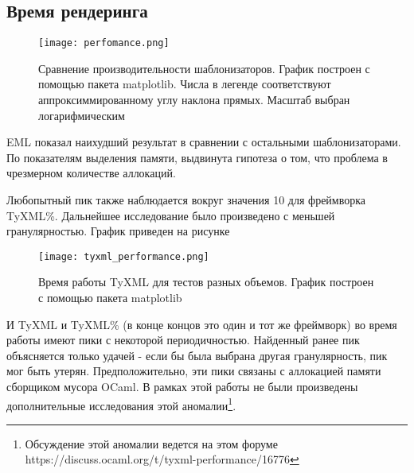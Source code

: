 

\subsection{Время рендеринга}


\begin{figure}
    \texttt{[image: perfomance.png]}
    \label{fig:perfomance}
    \caption{Сравнение производительности шаблонизаторов. График построен с помощью пакета matplotlib. Числа в легенде соответствуют аппроксиммированному углу наклона прямых. Масштаб выбран логарифмическим}
\end{figure}

EML показал наихудший результат в сравнении с остальными шаблонизаторами.
По показателям выделения памяти, выдвинута гипотеза о том, что проблема в чрезмерном количестве аллокаций.

Любопытный пик также наблюдается вокруг значения 10 для фреймворка TyXML\%.
Дальнейшее исследование было произведено с меньшей гранулярностью.
График приведен на рисунке %
\begin{figure}
    \texttt{[image: tyxml\_performance.png]}
    \label{fig:tyxml_perfomance}
    \caption{Время работы TyXML для тестов разных объемов. График построен с помощью пакета matplotlib}
\end{figure}

И TyXML и TyXML\% (в конце концов это один и тот же фреймворк) во время работы имеют пики с некоторой периодичностью.
Найденный ранее пик объясняется только удачей - если бы была выбрана другая гранулярность, пик мог быть утерян.
Предположительно, эти пики связаны с аллокацией памяти сборщиком мусора OCaml.
В рамках этой работы не были произведены дополнительные исследования этой аномалии\footnote{Обсуждение этой аномалии ведется на этом форуме https://discuss.ocaml.org/t/tyxml-performance/16776}. %
